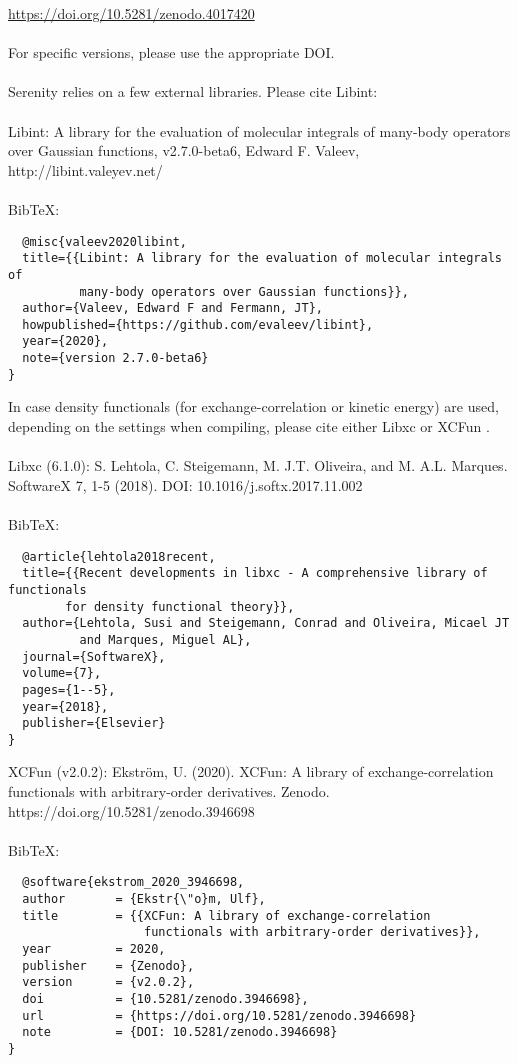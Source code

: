 \url{https://doi.org/10.5281/zenodo.4017420}\\
\\
For specific versions, please use the appropriate DOI.\\
\\
Serenity relies on a few external libraries. Please cite Libint: \cite{Libint2.7.0}\\
\\
Libint: A library for the evaluation of molecular integrals of many-body operators  over Gaussian functions, v2.7.0-beta6, Edward F. Valeev, http://libint.valeyev.net/ \\
\\
BibTeX:
\begin{lstlisting}
  @misc{valeev2020libint,
  title={{Libint: A library for the evaluation of molecular integrals of 
          many-body operators over Gaussian functions}},
  author={Valeev, Edward F and Fermann, JT},
  howpublished={https://github.com/evaleev/libint},
  year={2020},
  note={version 2.7.0-beta6}
}
\end{lstlisting}
In case density functionals (for exchange-correlation or kinetic energy) are used, depending on the settings when compiling, please cite either Libxc \cite{Libxc} or XCFun \cite{XCFun2.0.2}.\\
\\
Libxc (6.1.0): S. Lehtola, C. Steigemann, M. J.T. Oliveira, and M. A.L. Marques. SoftwareX 7, 1-5 (2018). DOI: 10.1016/j.softx.2017.11.002\\
\\
BibTeX:
\begin{lstlisting}
  @article{lehtola2018recent,
  title={{Recent developments in libxc - A comprehensive library of functionals
        for density functional theory}},
  author={Lehtola, Susi and Steigemann, Conrad and Oliveira, Micael JT
          and Marques, Miguel AL},
  journal={SoftwareX},
  volume={7},
  pages={1--5},
  year={2018},
  publisher={Elsevier}
}
\end{lstlisting}
XCFun (v2.0.2):  Ekström, U. (2020). XCFun: A library of exchange-correlation functionals with  arbitrary-order derivatives. Zenodo. https://doi.org/10.5281/zenodo.3946698  \\
\\
BibTeX:
\begin{lstlisting}
  @software{ekstrom_2020_3946698,
  author       = {Ekstr{\"o}m, Ulf},
  title        = {{XCFun: A library of exchange-correlation 
                   functionals with arbitrary-order derivatives}},
  year         = 2020,
  publisher    = {Zenodo},
  version      = {v2.0.2},
  doi          = {10.5281/zenodo.3946698},
  url          = {https://doi.org/10.5281/zenodo.3946698}
  note         = {DOI: 10.5281/zenodo.3946698}
}
\end{lstlisting}
